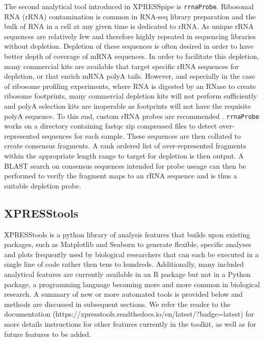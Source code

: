 \documentclass[11pt, a4paper, oneside]{article}
\begin{document}
The second analytical tool introduced in XPRESSpipe is \texttt{rrnaProbe}. Ribosomal RNA (rRNA) contamination is common in RNA-seq library preparation and the bulk of RNA in a cell at any given time is dedicated to rRNA. As unique rRNA sequences are relatively few and therefore highly repeated in sequencing libraries without depletion. Depletion of these sequences is often desired in order to have better depth of coverage of mRNA sequences. In order to facilitate this depletion, many commercial kits are available that target specific rRNA sequences for depletion, or that enrich mRNA polyA tails. However, and especially in the case of ribosome profiling experiments, where RNA is digested by an RNase to create ribosome footprints, many commercial depletion kits will not perform sufficiently and polyA selection kits are inoperable as footprints will not have the requisite polyA sequence. To this end, custom rRNA probes are recommended \cite{ingolia_meth, ingolia_science}. \texttt{rrnaProbe} works on a directory containing fastqc \cite{fastqc} zip compressed files to detect over-represented sequences for each sample. These sequences are then collated to create consensus fragments. A rank ordered list of over-represented fragments within the appropriate length range to target for depletion is then output. A BLAST \cite{blast} search on consensus sequences intended for probe useage can then be performed to verify the fragment maps to an rRNA sequence and is thus a suitable depletion probe.

\subsection{XPRESStools}
XPRESStools is a python library of analysis features that builds upon existing packages, such as Matplotlib \cite{matplotlib} and Seaborn \cite{seaborn} to generate flexible, specific analyses and plots frequently used by biological researchers that can each be executed in a single line of code rather then tens to hundreds. Additionally, many included analytical features are currently available in an R package but not in a Python package, a programming language becoming more and more common in biological research. A summary of new or more automated tools is provided below and methods are discussed in subsequent sections. We refer the reader to the documentation (https://xpresstools.readthedocs.io/en/latest/?badge=latest) for more details instructions for other features currently in the toolkit, as well as for future features to be added.
\end{document}
